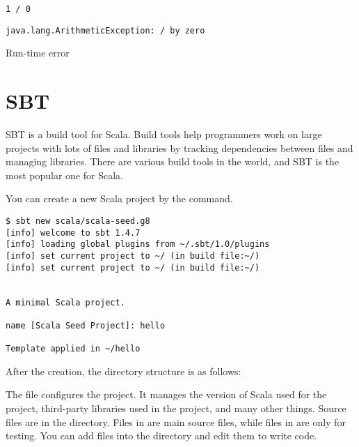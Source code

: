 \begin{verbatim}
1 / 0
\end{verbatim}
\vspace{-1em}
\begin{mdframed}[hidealllines=true,backgroundcolor=red!10,innerleftmargin=3pt,innerrightmargin=3pt,leftmargin=-3pt,rightmargin=-3pt]
\begin{verbatim}
java.lang.ArithmeticException: / by zero
\end{verbatim}
\vspace{-2em}
\begin{flushright}
\scriptsize\textsf{Run-time error}
\end{flushright}
\end{mdframed}

\section{SBT}

SBT is a build tool for Scala. Build tools help programmers work on large
projects with lots of files and libraries by tracking dependencies between files
and managing libraries. There are various build tools in the world, and SBT is
the most popular one for Scala.

You can create a new Scala project by the  command.

\begin{verbatim}
$ sbt new scala/scala-seed.g8
[info] welcome to sbt 1.4.7
[info] loading global plugins from ~/.sbt/1.0/plugins
[info] set current project to ~/ (in build file:~/)
[info] set current project to ~/ (in build file:~/)


A minimal Scala project.

name [Scala Seed Project]: hello

Template applied in ~/hello
\end{verbatim}

After the creation, the directory structure is as follows:


The  file configures the project. It manages the version of Scala
used for the project, third-party libraries used in the project, and many other
things.
Source files are in the  directory. Files in  are
main source files, while files in  are only for testing.
You can add files into the  directory and edit them to write code.

